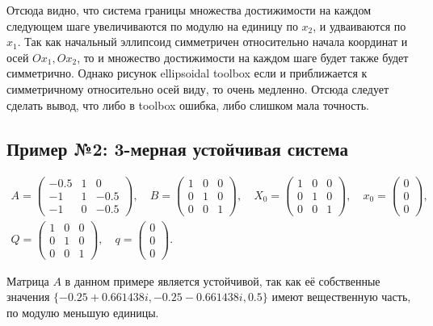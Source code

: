 \documentclass[10pt, a4paper]{article}
\begin{document}
Отсюда видно, что система границы множества достижимости на каждом следующем шаге увеличиваются по модулю на единицу по $x_2$, и удваиваются по $x_1$. Так как начальный эллипсоид симметричен относительно начала координат и осей $Ox_1, Ox_2$, то и множество достижимости на каждом шаге будет также будет симметрично. Однако рисунок ellipsoidal toolbox если и приближается к симметричному относительно осей виду, то очень медленно. Отсюда следует сделать вывод, что либо в toolbox ошибка, либо слишком мала точность.

\subsection{Пример №2: 3-мерная устойчивая система}
\begin{gather*} A =
\left(\begin{array}{ccc} -0.5 & 1 & 0\\ -1 & 1 & -0.5\\ -1 & 0 & -0.5 \end{array}\right),\quad
B =
\left(\begin{array}{ccc} 1 & 0 & 0\\ 0 & 1 & 0\\ 0 & 0 & 1 \end{array}\right),\quad
X_0 =
\left(\begin{array}{ccc} 1 & 0 & 0\\ 0 & 1 & 0\\ 0 & 0 & 1 \end{array}\right),\quad
x_0 =
\left(\begin{array}{c} 0\\ 0\\ 0 \end{array}\right),\quad \\
Q =
\left(\begin{array}{ccc} 1 & 0 & 0\\ 0 & 1 & 0\\ 0 & 0 & 1 \end{array}\right),\quad
q =
\left(\begin{array}{c} 0\\ 0\\ 0 \end{array}\right).
\end{gather*}

Матрица $A$ в данном примере является устойчивой, так как её собственные значения 
$\{-0.25 + 0.661438i, -0.25 - 0.661438i, 0.5\}$ имеют вещественную часть, по модулю меньшую единицы.
\end{document}
